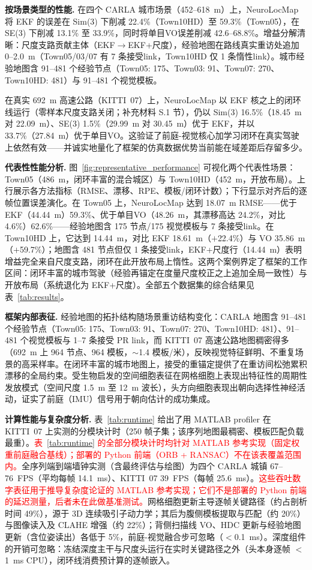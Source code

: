 \textbf{按场景类型的性能.} 在四个 CARLA 城市场景（452--618~m）上，NeuroLocMap 将 EKF 的误差在 Sim(3) 下削减 22.4\%（Town10HD）至 59.3\%（Town05），在 SE(3) 下削减 13.1\% 至 33.9\%，同时将单目VO误差削减 42.6--68.8\%。增益分解清晰：尺度支路贡献主体（EKF$\rightarrow$EKF+尺度），经验地图在路线真实重访处追加 0--2.0~m（Town05/03/07 有 7 条接受link，Town10HD 仅 1 条惰性link）。城市经验地图含 91--481 个经验节点（Town05: 175、Town03: 91、Town07: 270、Town10HD: 481）与 91--481 个视觉模板。

在真实 692~m 高速公路（KITTI~07）上，NeuroLocMap 以 EKF 核之上的闭环线运行（零样本尺度支路关闭；补充材料 S.1 节），仍以 Sim(3) 16.5\%（18.45~m 对 22.09~m）、SE(3) 1.5\%（29.99~m 对 30.45~m）优于 EKF，并以 33.7\%（27.84~m）优于单目VO。这验证了前庭-视觉核心加学习闭环在真实驾驶上依然有效——并诚实地量化了框架的仿真数据优势当前能在域差距后存留多少。

\textbf{代表性性能分析.} 图~\ref{fig:representative_performance} 可视化两个代表性场景：Town05（486~m，闭环丰富的混合城区）与 Town10HD（452~m，开放布局）。上行展示各方法指标（RMSE、漂移、RPE、模板/闭环计数）；下行显示对齐后的逐帧位置误差演化。在 Town05 上，NeuroLocMap 达到 18.07~m RMSE——优于 EKF（44.44~m）59.3\%、优于单目VO（48.26~m，其漂移高达 24.2\%，对比 4.6\%）62.6\%——经验地图含 175 节点/175 视觉模板与 7 条接受link。在 Town10HD 上，它达到 14.44~m，对比 EKF 18.61~m（$+$22.4\%）与 VO 35.86~m（$+$59.7\%）；地图含 481 节点但仅 1 条接受link，EKF+尺度行（14.44~m）表明增益完全来自尺度支路，闭环在此开放布局上惰性。这两个案例界定了框架的工作区间：闭环丰富的城市驾驶（经验再锚定在度量尺度校正之上追加全局一致性）与开放布局（系统退化为 EKF+尺度）。全部五个数据集的综合结果见表~\ref{tab:results}。

\textbf{框架内部表征.} 经验地图的拓扑结构随场景重访结构变化：CARLA 地图含 91--481 个经验节点（Town05: 175、Town03: 91、Town07: 270、Town10HD: 481）、91--481 个视觉模板与 1--7 条接受 PR link，而 KITTI~07 高速公路地图稠密得多（692~m 上 964 节点、964 模板，$\sim$1.4 模板/米），反映视觉特征鲜明、不重复场景的高采样率。在闭环丰富的城市地图上，接受的重锚定提供了在重访间松弛累积漂移的全局约束。受生物启发的空间细胞表征在网格细胞上表现出特征性的周期性发放模式（空间尺度 1.5~m 至 12~m 波长），头方向细胞表现出朝向选择性神经活动，证实了前庭（IMU）信号用于朝向估计的成功集成。

\textbf{计算性能与复杂度分析.} 表~\ref{tab:runtime} 给出了用 MATLAB profiler 在 KITTI~07 上实测的分模块计时（250 帧子集；该序列地图最稠密、模板匹配负载最重）。\textcolor{red}{表~\ref{tab:runtime} 的全部分模块计时均针对 MATLAB 参考实现（固定权重前庭融合基线）；部署的 Python 前端（ORB + RANSAC）不在该表覆盖范围内。}全序列端到端墙钟实测（含最终评估与绘图）为四个 CARLA 城镇 67--76~FPS（平均每帧 14.1~ms）、KITTI~07 39~FPS（每帧 25.6~ms）。\textcolor{red}{这些吞吐数字表征用于推导复杂度论证的 MATLAB 参考实现；它们不是部署的 Python 前端的延迟测量，后者未在此做基准测试。}网格细胞更新主导逐帧关键路径（约占剖析时间 49\%），源于 3D 连续吸引子动力学；其后为腹侧模板提取与匹配（约 20\%）与图像读入及 CLAHE 增强（约 22\%）；背侧扫描线 VO、HDC 更新与经验地图更新（含位姿读出）各低于 5\%，前庭-视觉融合步可忽略（$<$0.1~ms）。深度组件的开销可忽略：冻结深度主干与尺度头运行在实时关键路径之外（头本身逐帧 $<$1~ms CPU），闭环线消费预计算的逐帧嵌入。

